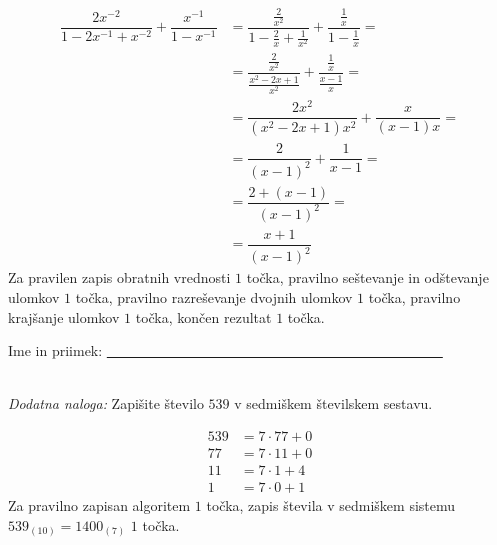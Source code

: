 \documentclass[addpoints]{exam}
\begin{document}
\begin{questions}
\begin{parts}
            \begin{solution}[3cm]
                \begin{align*}
                    \dfrac{2x^{-2}}{1-2x^{-1}+x^{-2}}+\dfrac{x^{-1}}{1-x^{-1}} &= \dfrac{\frac{2}{x^2}}{1-\frac{2}{x}+\frac{1}{x^2}}+\dfrac{\frac{1}{x}}{1-\frac{1}{x}}= \\
                                                                            &= \dfrac{\frac{2}{x^2}}{\frac{x^2-2x+1}{x^2}}+\dfrac{\frac{1}{x}}{\frac{x-1}{x}}= \\
                                                                            &= \dfrac{2x^2}{(x^2-2x+1)x^2}+\dfrac{x}{(x-1)x}= \\
                                                                            &= \dfrac{2}{(x-1)^2}+\dfrac{1}{x-1}= \\
                                                                            &= \dfrac{2+(x-1)}{(x-1)^2}= \\
                                                                            &= \dfrac{x+1}{(x-1)^2}
                \end{align*}
                Za pravilen zapis obratnih vrednosti $1$ točka, pravilno seštevanje in odštevanje ulomkov $1$ točka, pravilno razreševanje dvojnih ulomkov $1$ točka, pravilno krajšanje ulomkov $1$ točka, končen rezultat $1$ točka.
            \end{solution}
    
    
        \end{parts}








     \newpage

     \noindent Ime in priimek: \underline{~~~~~~~~~~~~~~~~~~~~~~~~~~~~~~~~~~~~~~~~~~~~~~~~}

     ~\\

    \bonusquestion[2]
    \textit{Dodatna naloga:} Zapišite število $539$ v sedmiškem številskem sestavu.

    \begin{solution}[7cm]
        \begin{align*}
            539 &= 7\cdot 77 + 0 \\
            77 &= 7\cdot 11 + 0 \\
            11 &= 7\cdot 1 + 4 \\
            1 &= 7\cdot 0 + 1
        \end{align*}
        Za pravilno zapisan algoritem $1$ točka, zapis števila v sedmiškem sistemu $539_{(10)}=1400_{(7)}$ $1$ točka.
    \end{solution}





\end{questions}
\end{document}
